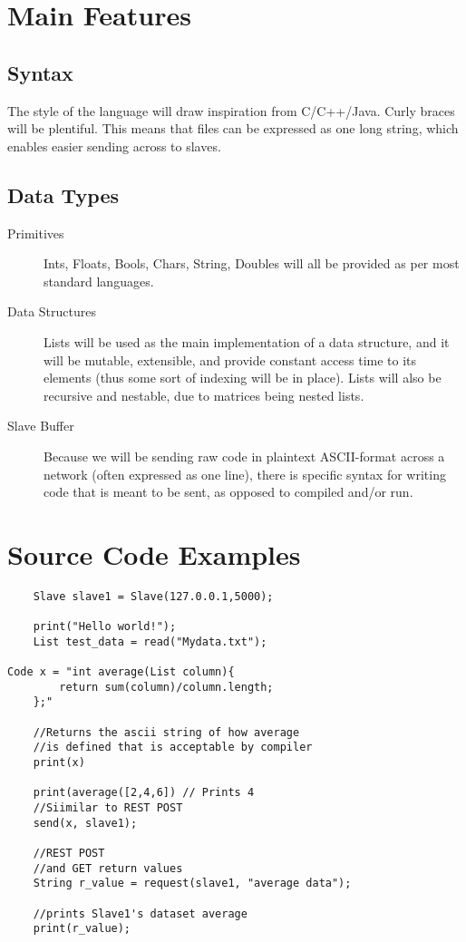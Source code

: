 \documentclass[10pt]{article}
\begin{document}
\section{Main Features}
	\subsection{Syntax}
    The style of the language will draw inspiration from C/C++/Java. Curly braces will be plentiful. This means that \name files can be expressed as one long string, which enables easier sending across to slaves.
    \subsection{Data Types}
    \begin{description}
    \item[Primitives] Ints, Floats, Bools, Chars, String, Doubles will all be provided as per most standard languages.
    \item[Data Structures] Lists will be used as the main implementation of a data structure, and it will be mutable, extensible, and provide constant access time to its elements (thus some sort of indexing will be in place). Lists will also be recursive and nestable, due to matrices being nested lists.
    \item[Slave Buffer] Because we will be sending raw code in plaintext ASCII-format across a network (often expressed as one line), there is specific syntax for writing code that is meant to be sent, as opposed to compiled and/or run.
    \end{description}
    
\section{Source Code Examples}
	\begin{lstlisting}
    Slave slave1 = Slave(127.0.0.1,5000);
    
    print("Hello world!");
    List test_data = read("Mydata.txt");
    
Code x = "int average(List column){
    	return sum(column)/column.length;
    };"
    
    //Returns the ascii string of how average  
    //is defined that is acceptable by compiler
    print(x) 
    
    print(average([2,4,6]) // Prints 4
    //Siimilar to REST POST
    send(x, slave1);
    
    //REST POST
    //and GET return values
    String r_value = request(slave1, "average data"); 
    
    //prints Slave1's dataset average
    print(r_value); 
    
    
    
    
    
    
    \end{lstlisting}
\end{document}
